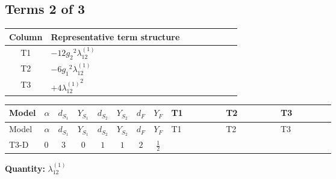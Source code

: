 \documentclass[8pt]{article}
\begin{document}
\begin{landscape}
\subsection*{Terms 2 of 3}
\begin{center}
\begin{tabular}{@{}c >{\raggedright\arraybackslash}p{0.82\linewidth}@{}}
\toprule
Column & Representative term structure \\
\midrule
T1 & \(\displaystyle -12 {g_2}^2 {\lambda_{12}^{(1)}}\) \\
\midrule
T2 & \(\displaystyle -6 {g_1}^2 {\lambda_{12}^{(1)}}\) \\
\midrule
T3 & \(\displaystyle +4 {\lambda_{12}^{(1)}}^2\) \\
\midrule
\bottomrule
\end{tabular}
\end{center}
\smallskip
\tiny
\begin{longtable}{@{}llcccccc >{\raggedright\arraybackslash}p{0.21\linewidth} >{\raggedright\arraybackslash}p{0.21\linewidth} >{\raggedright\arraybackslash}p{0.21\linewidth}@{}}
\toprule
Model & $\alpha$ & $d_{S_1}$ & $Y_{S_1}$ & $d_{S_2}$ & $Y_{S_2}$ & $d_F$ & $Y_F$ & T1 & T2 & T3 \\
\midrule
\endfirsthead
\toprule
Model & $\alpha$ & $d_{S_1}$ & $Y_{S_1}$ & $d_{S_2}$ & $Y_{S_2}$ & $d_F$ & $Y_F$ & T1 & T2 & T3 \\
\midrule
\endhead
T3-D & $0$ & $3$ & $0$ & $1$ & $1$ & $2$ & $\frac{1}{2}$ & \scriptsize\adjustbox{max width=\linewidth}{$\begin{gathered} -12 {g_2}^2 {\lambda_{12}^{(1)}}\end{gathered}$} & \scriptsize\adjustbox{max width=\linewidth}{$\begin{gathered} -6 {g_1}^2 {\lambda_{12}^{(1)}}\end{gathered}$} & \scriptsize\adjustbox{max width=\linewidth}{$\begin{gathered} +4 {\lambda_{12}^{(1)}}^2\end{gathered}$} \\
\midrule
\bottomrule
\end{longtable}
\clearpage
\noindent\textbf{Quantity: }$\lambda_{12}^{(1)}$\par\smallskip

\end{landscape}
\end{document}
